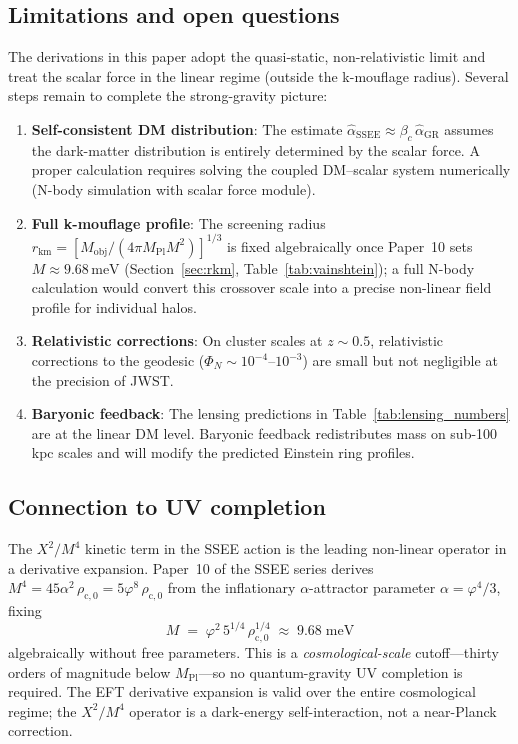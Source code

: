 \documentclass[12pt,a4paper]{article}
\newcommand{\phiG}{\varphi}
\newcommand{\Mpl}{M_{\mathrm{Pl}}}
\newcommand{\bc}{\beta_c}
\newcommand{\rV}{r_{\mathrm{km}}}
\newcommand{\hatalf}{\hat{\alpha}}
\newcommand{\rhoc}{\rho_{\mathrm{c},0}}
\begin{document}
\subsection{Limitations and open questions}

The derivations in this paper adopt the quasi-static, non-relativistic
limit and treat the scalar force in the linear regime (outside the
k-mouflage radius).
Several steps remain to complete the strong-gravity picture:

\begin{enumerate}
  \item \textbf{Self-consistent DM distribution}: The estimate
        $\hatalf_{\mathrm{SSEE}} \approx \bc\,\hatalf_{\mathrm{GR}}$
        assumes the dark-matter distribution is entirely determined by the
        scalar force.
        A proper calculation requires solving the coupled DM--scalar system
        numerically (N-body simulation with scalar force module).

  \item \textbf{Full k-mouflage profile}: The screening radius
        $\rV = [M_{\mathrm{obj}}/(4\pi\Mpl M^2)]^{1/3}$ is fixed
        algebraically once Paper~10 sets $M \approx 9.68\,\mathrm{meV}$
        (Section~\ref{sec:rkm}, Table~\ref{tab:vainshtein});
        a full N-body calculation would convert this crossover scale into
        a precise non-linear field profile for individual halos.

  \item \textbf{Relativistic corrections}: On cluster scales at $z \sim 0.5$,
        relativistic corrections to the geodesic
        ($\Phi_N \sim 10^{-4}$--$10^{-3}$) are small but not negligible
        at the precision of JWST.

  \item \textbf{Baryonic feedback}: The lensing predictions in
        Table~\ref{tab:lensing_numbers} are at the linear DM level.
        Baryonic feedback redistributes mass on sub-100 kpc scales and
        will modify the predicted Einstein ring profiles.
\end{enumerate}

\subsection{Connection to UV completion}

The $X^2/M^4$ kinetic term in the SSEE action is the leading non-linear
operator in a derivative expansion.
Paper~10 of the SSEE series derives
$M^4 = 45\alpha^2\,\rhoc = 5\phiG^8\,\rhoc$ from the inflationary $\alpha$-attractor
parameter $\alpha = \phiG^4/3$, fixing
\begin{equation}
  M \;=\; \phiG^2\,5^{1/4}\,\rhoc^{1/4} \;\approx\; 9.68\;\mathrm{meV}
\end{equation}
algebraically without free parameters.
This is a \emph{cosmological-scale} cutoff---thirty orders of magnitude
below $\Mpl$---so no quantum-gravity UV completion is required.
The EFT derivative expansion is valid over the entire cosmological regime;
the $X^2/M^4$ operator is a dark-energy self-interaction, not a near-Planck correction.
\end{document}
